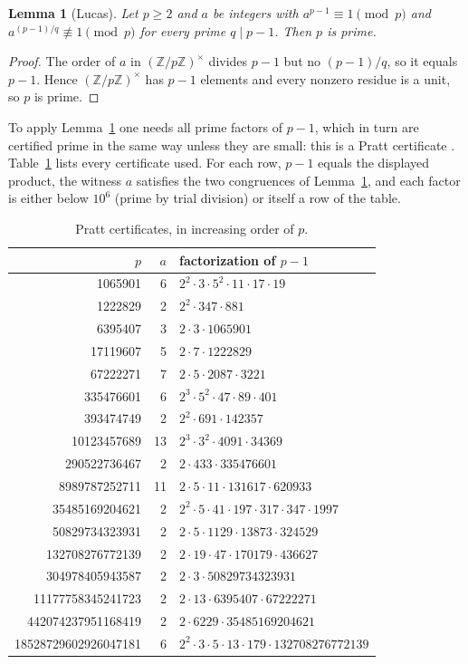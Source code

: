 \documentclass[11pt]{article}
\theoremstyle{plain}
\newtheorem{lemma}[theorem]{Lemma}
\theoremstyle{definition}
\theoremstyle{remark}
\begin{document}
\begin{lemma}[Lucas]\label{lem:lucas}
Let $p\ge2$ and $a$ be integers with $a^{p-1}\equiv1\pmod p$ and
$a^{(p-1)/q}\not\equiv1\pmod p$ for every prime $q\mid p-1$. Then $p$ is
prime.
\end{lemma}

\begin{proof}
The order of $a$ in $(\mathbb Z/p\mathbb Z)^\times$ divides $p-1$ but no
$(p-1)/q$, so it equals $p-1$. Hence $(\mathbb Z/p\mathbb Z)^\times$ has
$p-1$ elements and every nonzero residue is a unit, so $p$ is prime.
\end{proof}

To apply Lemma~\ref{lem:lucas} one needs all prime factors of $p-1$, which
in turn are certified prime in the same way unless they are small: this is a
Pratt certificate \cite{pratt}. Table~\ref{tab:cert} lists every certificate
used. For each row, $p-1$ equals the displayed product, the witness $a$
satisfies the two congruences of Lemma~\ref{lem:lucas}, and each factor is
either below $10^6$ (prime by trial division) or itself a row of the table.

\begin{table}[ht]
\centering
\small
\begin{tabular}{rrl}
\toprule
$p$ & $a$ & factorization of $p-1$\\
\midrule
1065901 & 6 & $2^{2} \cdot 3 \cdot 5^{2} \cdot 11 \cdot 17 \cdot 19$ \\
1222829 & 2 & $2^{2} \cdot 347 \cdot 881$ \\
6395407 & 3 & $2 \cdot 3 \cdot 1065901$ \\
17119607 & 5 & $2 \cdot 7 \cdot 1222829$ \\
67222271 & 7 & $2 \cdot 5 \cdot 2087 \cdot 3221$ \\
335476601 & 6 & $2^{3} \cdot 5^{2} \cdot 47 \cdot 89 \cdot 401$ \\
393474749 & 2 & $2^{2} \cdot 691 \cdot 142357$ \\
10123457689 & 13 & $2^{3} \cdot 3^{2} \cdot 4091 \cdot 34369$ \\
290522736467 & 2 & $2 \cdot 433 \cdot 335476601$ \\
8989787252711 & 11 & $2 \cdot 5 \cdot 11 \cdot 131617 \cdot 620933$ \\
35485169204621 & 2 & $2^{2} \cdot 5 \cdot 41 \cdot 197 \cdot 317 \cdot 347 \cdot 1997$ \\
50829734323931 & 2 & $2 \cdot 5 \cdot 1129 \cdot 13873 \cdot 324529$ \\
132708276772139 & 2 & $2 \cdot 19 \cdot 47 \cdot 170179 \cdot 436627$ \\
304978405943587 & 2 & $2 \cdot 3 \cdot 50829734323931$ \\
11177758345241723 & 2 & $2 \cdot 13 \cdot 6395407 \cdot 67222271$ \\
442074237951168419 & 2 & $2 \cdot 6229 \cdot 35485169204621$ \\
18528729602926047181 & 6 & $2^{2} \cdot 3 \cdot 5 \cdot 13 \cdot 179 \cdot 132708276772139$ \\
\bottomrule
\end{tabular}
\caption{Pratt certificates, in increasing order of $p$.}
\label{tab:cert}
\end{table}
\end{document}
